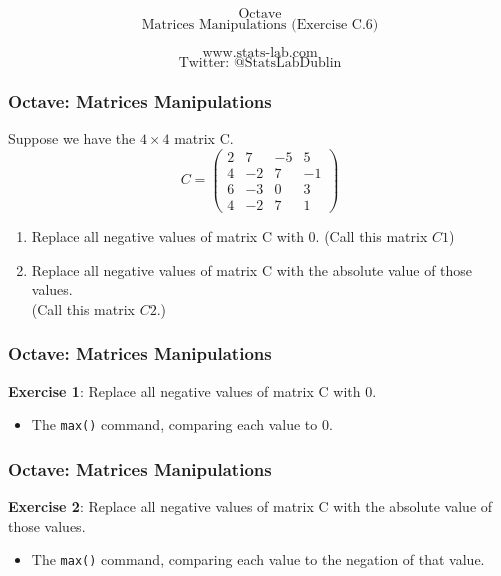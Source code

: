 \documentclass{beamer}
\begin{document}
\begin{frame}
\bigskip
{
\Huge
\[ \mbox{Octave}  \]
}
{
\huge
\[ \mbox{Matrices Manipulations (Exercise C.6)}  \]
}

{
\LARGE
\[ \mbox{www.stats-lab.com}  \]
\[ \mbox{Twitter: @StatsLabDublin} \]
}

\end{frame}
\begin{frame}
\frametitle{Octave: Matrices Manipulations}
{
\Large
Suppose we have the $4 \times 4$ matrix C.
}
{\Large
\[C = \left( \begin{array}{cccc}
2& 7& -5& 5\\
4&-2 & 7& -1\\
6&-3 & 0& 3 \\
4&-2 & 7& 1
\end{array} \right)
\]
}
{
\Large
\begin{enumerate}
\item Replace all negative values of matrix C with 0. (Call this matrix $C1$)
\item Replace all negative values of matrix C with the absolute value of those values. \\(Call this matrix $C2$.)
\end{enumerate}
}
\end{frame}
\begin{frame}
\frametitle{Octave: Matrices Manipulations}
\LARGE
\textbf{Exercise 1}: Replace all negative values of matrix C with 0. \\

\begin{itemize}
\item The \texttt{max()} command, comparing each value to 0.
\end{itemize} 

\end{frame}
\begin{frame}
\frametitle{Octave: Matrices Manipulations}
\LARGE
\textbf{Exercise 2}: Replace all negative values of matrix C with the absolute value of those values.\\

\begin{itemize}
\item The \texttt{max()} command, comparing each value to the negation of that value.
\end{itemize} 

\end{frame}

\end{document}
